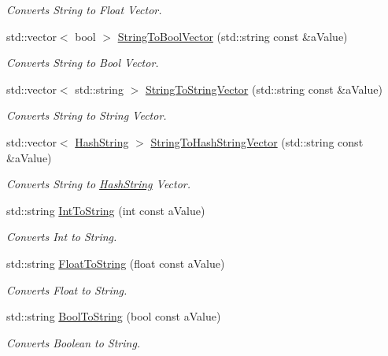 \begin{DoxyCompactItemize}
\begin{DoxyCompactList}\small\item\em Converts String to Float Vector. \end{DoxyCompactList}\item 
std\+::vector$<$ bool $>$ \hyperlink{namespaceCommon_ac079fde773cfeac7b049a58cda7b5d94}{String\+To\+Bool\+Vector} (std\+::string const \&a\+Value)
\begin{DoxyCompactList}\small\item\em Converts String to Bool Vector. \end{DoxyCompactList}\item 
std\+::vector$<$ std\+::string $>$ \hyperlink{namespaceCommon_aa857ec2f8590997d38a962106e00a665}{String\+To\+String\+Vector} (std\+::string const \&a\+Value)
\begin{DoxyCompactList}\small\item\em Converts String to String Vector. \end{DoxyCompactList}\item 
std\+::vector$<$ \hyperlink{classHashString}{Hash\+String} $>$ \hyperlink{namespaceCommon_a75c4ca78dc57b61f2716fa790b60aedd}{String\+To\+Hash\+String\+Vector} (std\+::string const \&a\+Value)
\begin{DoxyCompactList}\small\item\em Converts String to \hyperlink{classHashString}{Hash\+String} Vector. \end{DoxyCompactList}\item 
std\+::string \hyperlink{namespaceCommon_a4f4719858903c264a76f1f6835dc223b}{Int\+To\+String} (int const a\+Value)
\begin{DoxyCompactList}\small\item\em Converts Int to String. \end{DoxyCompactList}\item 
std\+::string \hyperlink{namespaceCommon_ab0bd4076a5c4cd7fdf2a0692b5510abd}{Float\+To\+String} (float const a\+Value)
\begin{DoxyCompactList}\small\item\em Converts Float to String. \end{DoxyCompactList}\item 
std\+::string \hyperlink{namespaceCommon_a0f38dc478fcdf11cc930463152633056}{Bool\+To\+String} (bool const a\+Value)
\begin{DoxyCompactList}\small\item\em Converts Boolean to String. \end{DoxyCompactList}\item 

\end{DoxyCompactItemize}

